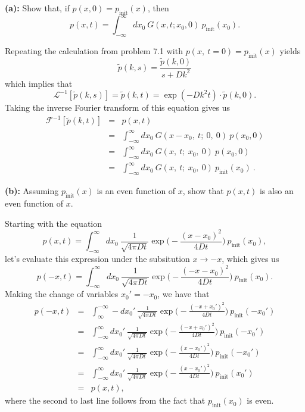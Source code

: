\textbf{(a):} Show that, if $p(x,0)=p_\text{init}(x)$, then
\begin{equation}
p(x,t) = \int_{-\infty}^{\infty} dx_0~G(x, t; x_0, 0)~p_\text{init}(x_0).
\end{equation}

Repeating the calculation from problem 7.1 with $p(x,~t=0) = p_\text{init}(x)$ yields
\begin{equation}
\tilde{p}(k, s)  = \frac{\tilde{p}(k, 0)}{s + D k^2}
\end{equation}
which implies that 
\begin{equation}
\mathcal{L}^{-1} [\tilde{p}(k, s)] = \tilde{p}(k, t) = \exp(-D k^2 t) \cdot \tilde{p}(k, 0).
\end{equation}
Taking the inverse Fourier transform of this equation gives us
\begin{eqnarray}
\mathcal{F}^{-1} [\tilde{p}(k, t)] &=& p(x,t) \nonumber \\
&=& \int_{-\infty}^{\infty} dx_0~ G(x-x_0,~t;~0,~0)~p(x_0,0) \nonumber \\
&=& \int_{-\infty}^{\infty} dx_0~ G(x,~t;~x_0,~0)~p(x_0,0) \nonumber \\
&=& \boxed{\int_{-\infty}^{\infty} dx_0~G(x,~t;~x_0,~0)~p_\text{init}(x_0)}~.
\end{eqnarray}

\textbf{(b):} Assuming $p_\text{init}(x)$ is an even function of $x$, show that $p(x,t)$ is also an even function of $x$.

Starting with the equation 
\begin{equation}
p(x,t) = \int_{-\infty}^{\infty} dx_0~\frac{1}{\sqrt{4 \pi D t} } \exp\bigg(- \frac{(x-x_0)^2}{4 D t}\bigg)~p_\text{init}(x_0),
\end{equation}
let's evaluate this expression under the subsitution $x \rightarrow -x$, which gives us
\begin{equation}
p(-x,t) = \int_{-\infty}^{\infty} dx_0~\frac{1}{\sqrt{4 \pi D t} } \exp\bigg(- \frac{(-x-x_0)^2}{4 D t}\bigg)~p_\text{init}(x_0).
\end{equation}
Making the change of variables $x_0' = -x_0$, we have that
\begin{eqnarray}
p(-x,t) &=& \int_{\infty}^{-\infty} -dx_0'~\frac{1}{\sqrt{4 \pi D t} } \exp\bigg(- \frac{(-x+x_0')^2}{4 D t}\bigg)~p_\text{init}(-x_0') \nonumber \\
&=& \int_{-\infty}^{\infty} dx_0'~\frac{1}{\sqrt{4 \pi D t} } \exp\bigg(- \frac{(-x+x_0')^2}{4 D t}\bigg)~p_\text{init}(-x_0') \nonumber \\
&=& \int_{-\infty}^{\infty} dx_0'~\frac{1}{\sqrt{4 \pi D t} } \exp\bigg(- \frac{(x-x_0')^2}{4 D t}\bigg)~p_\text{init}(-x_0') \nonumber \\
&=& \int_{-\infty}^{\infty} dx_0'~\frac{1}{\sqrt{4 \pi D t} } \exp\bigg(- \frac{(x-x_0')^2}{4 D t}\bigg)~p_\text{init}(x_0') \nonumber \\
&=& p(x,t),
\end{eqnarray}
where the second to last line follows from the fact that $p_\text{init}(x_0)$ is even.